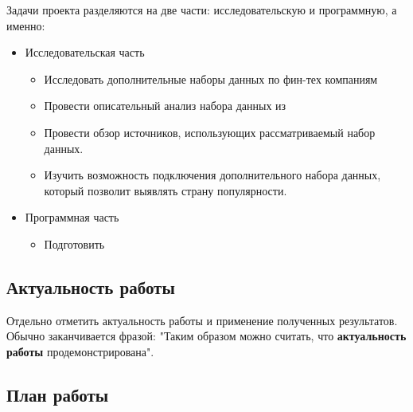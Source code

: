 Задачи проекта разделяются на две части: исследовательскую и программную, а именно:

\begin{itemize}
  \item{Исследовательская часть}
    \begin{itemize}
        \item {Исследовать дополнительные наборы данных по фин-тех компаниям}
        \item {Провести описательный анализ набора данных из \cite{?}}
        \item {Провести обзор источников, использующих рассматриваемый набор данных.}
        \item {Изучить возможность подключения дополнительного набора данных, который позволит выявлять страну популярности.}
    \end{itemize}
  \item{Программная часть}
      \begin{itemize}
        \item{Подготовить }
    \end{itemize}
\end{itemize}

\subsection{Актуальность работы}
Отдельно отметить актуальность работы и применение полученных результатов. Обычно заканчивается фразой: "Таким образом можно считать, что \textbf{актуальность работы} продемонстрирована".

\subsection{План работы}

